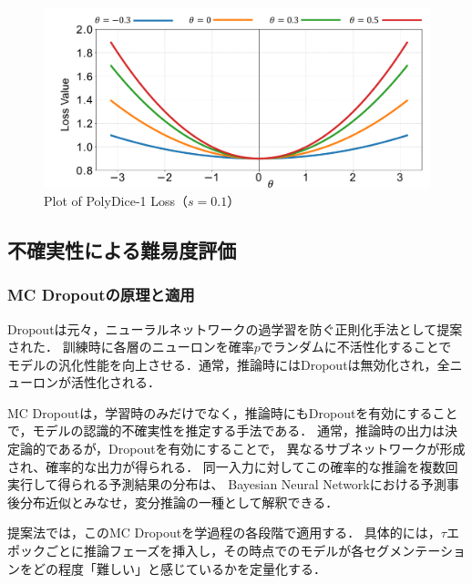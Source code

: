\documentclass[10pt, a4paper, twocolumn]{jarticle}
\begin{document}
\begin{figure}
  \includegraphics[width=\columnwidth]{figure/loss.pdf}
  \caption{Plot of PolyDice-1 Loss（$s = 0.1$）}
  \label{polydice}
\end{figure}

\subsection{不確実性による難易度評価}

\subsubsection{MC Dropoutの原理と適用}

Dropoutは元々，ニューラルネットワークの過学習を防ぐ正則化手法として提案された\cite{JMLR:v15:srivastava14a}．
訓練時に各層のニューロンを確率$p$でランダムに不活性化することで
モデルの汎化性能を向上させる．通常，推論時にはDropoutは無効化され，全ニューロンが活性化される．

MC Dropoutは，学習時のみだけでなく，推論時にもDropoutを有効にすることで，モデルの認識的不確実性を推定する手法である．
通常，推論時の出力は決定論的であるが，Dropoutを有効にすることで，
異なるサブネットワークが形成され、確率的な出力が得られる．
同一入力に対してこの確率的な推論を複数回実行して得られる予測結果の分布は、
Bayesian Neural Networkにおける予測事後分布近似とみなせ，変分推論の一種として解釈できる．

提案法では，このMC Dropoutを学過程の各段階で適用する．
具体的には，$\tau$エポックごとに推論フェーズを挿入し，その時点でのモデルが各セグメンテーションをどの程度「難しい」と感じているかを定量化する．
\end{document}
